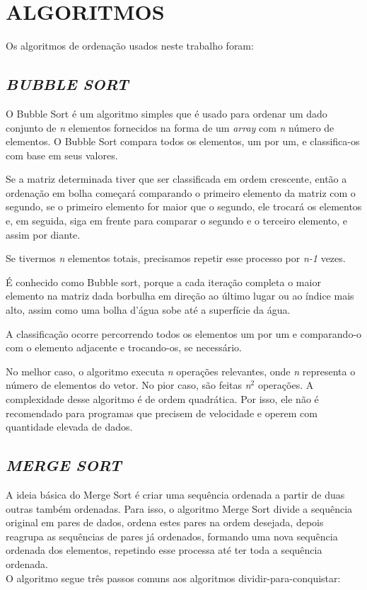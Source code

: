\section{\normalsize ALGORITMOS}
	Os algoritmos de ordenação usados neste trabalho foram:
	
	\subsection{\normalsize \textit{BUBBLE SORT}}
		O Bubble Sort é um algoritmo simples que é usado para ordenar um dado conjunto de \textit{n} elementos fornecidos na forma de um \textit{array} com \textit{n} número de elementos. O Bubble Sort compara todos os elementos, um por um, e classifica-os com base em seus valores.

		Se a matriz determinada tiver que ser classificada em ordem crescente, então a ordenação em bolha começará comparando o primeiro elemento da matriz com o segundo, se o primeiro elemento for maior que o segundo, ele trocará os elementos e, em seguida, siga em frente para comparar o segundo e o terceiro elemento, e assim por diante.

		Se tivermos \textit{n} elementos totais, precisamos repetir esse processo por \textit{n-1} vezes.

		É conhecido como Bubble sort, porque a cada iteração completa o maior elemento na matriz dada borbulha em direção ao último lugar ou ao índice mais alto, assim como uma bolha d'água sobe até a superfície da água.

		A classificação ocorre percorrendo todos os elementos um por um e comparando-o com o elemento adjacente e trocando-os, se necessário.

		No melhor caso, o algoritmo executa \textit{n} operações relevantes, onde \textit{n} representa o número de elementos do vetor. No pior caso, são feitas \textit{n}$^{2}$ operações. A complexidade desse algoritmo é de ordem quadrática. Por isso, ele não é recomendado para programas que precisem de velocidade e operem com quantidade elevada de dados.
	
	\subsection{\normalsize \textit{MERGE SORT}}
		A ideia básica do Merge Sort é criar uma sequência ordenada a partir de duas outras também ordenadas. Para isso, o algoritmo Merge Sort divide a sequência original em pares de dados, ordena estes pares na ordem desejada, depois reagrupa as sequências de pares já ordenados, formando uma nova sequência ordenada dos elementos, repetindo esse processa até ter toda a sequência ordenada.\\
		O algoritmo segue três passos comuns aos algoritmos dividir-para-conquistar:
		
